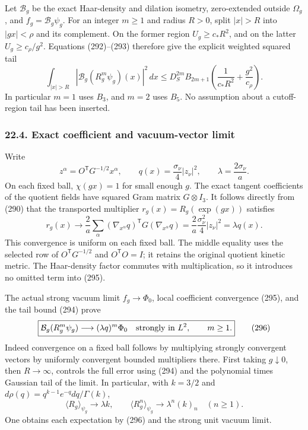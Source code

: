 \documentclass[
  11pt,
]{article}
\begin{document}
Let \(\mathcal B_g\) be the exact Haar-density and dilation isometry,
zero-extended outside \(\Omega_g\), and \(f_g=\mathcal B_g\psi_g\). For
an integer \(m\ge1\) and radius \(R>0\), split \(|x|>R\) into
\(|gx|<\rho\) and its complement. On the former region
\(U_g\ge c_*R^2\), and on the latter \(U_g\ge c_\rho/g^2\). Equations
(292)--(293) therefore give the explicit weighted squared tail \[
 \boxed{
 \int_{|x|>R}|\mathcal B_g(R_g^m\psi_g)(x)|^2\,dx
 \le D_S^{2m}B_{2m+1}
           \left(\frac1{c_*R^2}+\frac{g^2}{c_\rho}\right).
 }
 \tag{294}
\] In particular \(m=1\) uses \(B_3\), and \(m=2\) uses \(B_5\). No
assumption about a cutoff-region tail has been inserted.

\subsubsection{22.4. Exact coefficient and vacuum-vector
limit}\label{exact-coefficient-and-vacuum-vector-limit}

Write \[
 z^\alpha=O^{\mathsf T}G^{-1/2}x^\alpha,\qquad
 q(x)=\frac{\sigma_\nu}{4}|z_\nu|^2,\qquad
 \lambda=\frac{2\sigma_\nu}{a}.
\] On each fixed ball, \(\chi(gx)=1\) for small enough \(g\). The exact
tangent coefficients of the quotient fields have squared Gram matrix
\(G\otimes I_3\). It follows directly from (290) that the transported
multiplier \(r_g(x)=R_g(\exp(gx))\) satisfies \[
 r_g(x)\longrightarrow
 \frac2a\sum_\alpha(\nabla_{x^\alpha}q)^{\mathsf T}
                       G(\nabla_{x^\alpha}q)
 =\frac2a\frac{\sigma_\nu^2}{4}|z_\nu|^2
 =\lambda q(x).
 \tag{295}
\] This convergence is uniform on each fixed ball. The middle equality
uses the selected row of \(O^{\mathsf T}G^{-1/2}\) and
\(O^{\mathsf T}O=I\); it retains the original quotient kinetic metric.
The Haar-density factor commutes with multiplication, so it introduces
no omitted term into (295).

The actual strong vacuum limit \(f_g\to\Phi_0\), local coefficient
convergence (295), and the tail bound (294) prove \[
 \boxed{\mathcal B_g(R_g^m\psi_g)
            \longrightarrow(\lambda q)^m\Phi_0
       \quad\hbox{strongly in }L^2,\qquad m\ge1.}
 \tag{296}
\] Indeed convergence on a fixed ball follows by multiplying strongly
convergent vectors by uniformly convergent bounded multipliers there.
First taking \(g\downarrow0\), then \(R\to\infty\), controls the full
error using (294) and the polynomial times Gaussian tail of the limit.
In particular, with \(k=3/2\) and
\(d\rho(q)=q^{k-1}e^{-q}dq/\Gamma(k)\), \[
 \langle R_g\rangle_{\psi_g}\to\lambda k,\qquad
 \langle R_g^n\rangle_{\psi_g}\to\lambda^n(k)_n
 \quad(n\ge1).
 \tag{297}
\] One obtains each expectation by (296) and the strong unit vacuum
limit.
\end{document}
